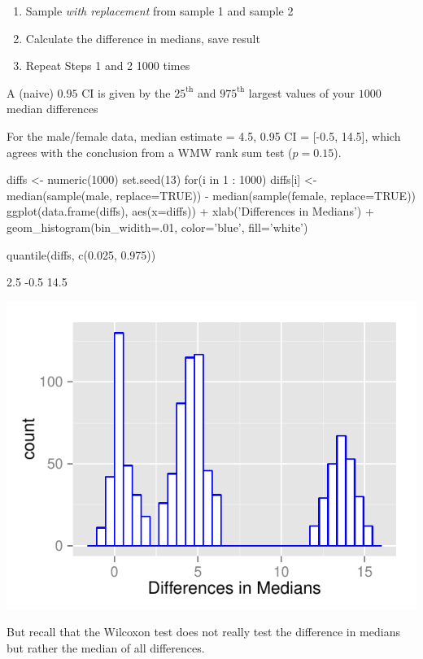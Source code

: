 \begin{enumerate}
\item Sample \textit{with replacement} from sample 1 and sample 2
\item Calculate the difference in medians, save result
\item Repeat Steps 1 and 2 1000 times
\end{enumerate}
\item A (naive) $0.95$ CI is given by the $25^\textrm{th}$ and $975^\textrm{th}$ largest values of your $1000$ median differences
\item For the male/female data, median estimate = 4.5, 0.95 CI = [-0.5, 14.5], which agrees with the conclusion from a WMW rank sum test ($p = 0.15$).
\ei
\ei
\begin{Schunk}
\begin{Sinput}
diffs <- numeric(1000)
set.seed(13)
for(i in 1 : 1000) diffs[i] <-
  median(sample(male, replace=TRUE)) - median(sample(female, replace=TRUE))
ggplot(data.frame(diffs), aes(x=diffs)) + xlab('Differences in Medians') +
  geom_histogram(bin_widith=.01, color='blue', fill='white')
\end{Sinput}
\begin{Sinput}
quantile(diffs, c(0.025, 0.975))
\end{Sinput}
\begin{Soutput}
 2.5%
 -0.5  14.5 
\end{Soutput}


\centerline{\includegraphics{nonpar-diffmedboot-1} }

\end{Schunk}
But recall that the Wilcoxon test does not really test the difference
in medians but rather the median of all differences.


